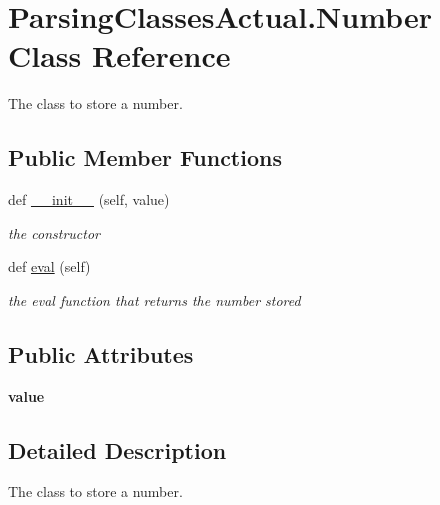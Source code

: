 \hypertarget{class_parsing_classes_actual_1_1_number}{}\section{Parsing\+Classes\+Actual.\+Number Class Reference}
\label{class_parsing_classes_actual_1_1_number}


The class to store a number.  


\subsection*{Public Member Functions}
\begin{DoxyCompactItemize}
\item 
def \hyperlink{class_parsing_classes_actual_1_1_number_afed3ef381388f6d2db19fec207e2bbf5}{\+\_\+\+\_\+init\+\_\+\+\_\+} (self, value)
\begin{DoxyCompactList}\small\item\em the constructor \end{DoxyCompactList}\item 
def \hyperlink{class_parsing_classes_actual_1_1_number_a77c608400a103e348084417e5a2782ef}{eval} (self)\hypertarget{class_parsing_classes_actual_1_1_number_a77c608400a103e348084417e5a2782ef}{}\label{class_parsing_classes_actual_1_1_number_a77c608400a103e348084417e5a2782ef}

\begin{DoxyCompactList}\small\item\em the eval function that returns the number stored \end{DoxyCompactList}\end{DoxyCompactItemize}
\subsection*{Public Attributes}
\begin{DoxyCompactItemize}
\item 
{\bfseries value}\hypertarget{class_parsing_classes_actual_1_1_number_a88d148e6057e4ed5014e20876a7e8496}{}\label{class_parsing_classes_actual_1_1_number_a88d148e6057e4ed5014e20876a7e8496}

\end{DoxyCompactItemize}


\subsection{Detailed Description}
The class to store a number. 

